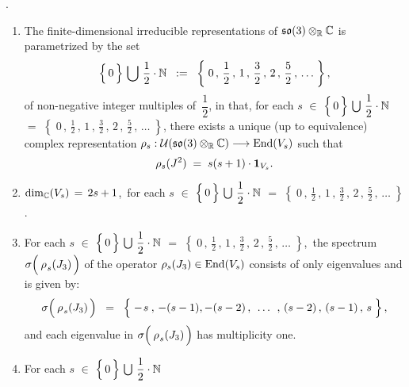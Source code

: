\vskip 0.5cm
\begin{theorem}
{\color{white}.}\vskip -0.1cm
\noindent
\begin{enumerate}
\item
	The finite-dimensional irreducible representations of $\mathfrak{so}(3) \otimes_{\mathbb{R}} \mathbb{C}$ is parametrized by the set
	\begin{equation*}
	\left\{\,\overset{{\color{white}.}}{0}\,\right\} \,\bigcup\, \dfrac{1}{2} \cdot \N
	\;\; := \;\;
		\left\{\;0 \,,\, \dfrac{1}{2} \,,\, 1 \,,\, \frac{3}{2} \,,\, 2 \,,\, \frac{5}{2} \,,\, \ldots \;\right\},
	\end{equation*}
	of non-negative integer multiples of \,$\dfrac{1}{2}$, in that, for each
	$s$
	$\in$ $\left\{\,\overset{{\color{white}.}}{0}\,\right\} \,\bigcup\, \dfrac{1}{2} \cdot \N$
	$=$ $\left\{\; 0 \,,\, \frac{1}{2}\,,\, 1\,,\, \frac{3}{2}\,,\, 2\,,\, \frac{5}{2}\,,\, \ldots \;\right\}$,
	there exists a unique (up to equivalence) complex representation
	$\rho_{s} : \mathcal{U}(\mathfrak{so}(3)\otimes_{\mathbb{R}}\mathbb{C}) \longrightarrow \textnormal{End}(V_{s})$
	such that
	\begin{equation*}
	\rho_{s}(J^{2}) \; = \; s(s+1)\cdot\textnormal{\textbf{1}}_{V_{s}}.
	\end{equation*}
\item
	$\dim_{\mathbb{C}}(V_{s}) \, = \, 2s + 1$,\, for each
	$s$
	$\in$ $\left\{\,\overset{{\color{white}.}}{0}\,\right\} \,\bigcup\, \dfrac{1}{2} \cdot \N$
	$=$ $\left\{\; 0 \,,\, \frac{1}{2}\,,\, 1\,,\, \frac{3}{2}\,,\, 2\,,\, \frac{5}{2}\,,\, \ldots \;\right\}$.
\item
	For each
	$s$
	$\in$ $\left\{\,\overset{{\color{white}.}}{0}\,\right\} \,\bigcup\, \dfrac{1}{2} \cdot \N$
	$=$ $\left\{\; 0 \,,\, \frac{1}{2}\,,\, 1\,,\, \frac{3}{2}\,,\, 2\,,\, \frac{5}{2}\,,\, \ldots \;\right\}$,\,
	the spectrum
	$\sigma\!\left(\,\overset{{\color{white}-}}{\rho}_{s}(J_{3})\,\right)$
	of the operator $\rho_{s}(J_{3}) \in \textnormal{End}(V_{s})$
	consists of only eigenvalues and is given by:
	\begin{equation*}
	\sigma\!\left(\,\overset{{\color{white}-}}{\rho}_{s}(J_{3})\,\right)
	\;\; = \;\;
		\left\{\;
			-\overset{{\color{white}-}}{s} \,,\, -(s-1), -(s-2)
			\,,\;\, \ldots \,\;,\,
			(s-2) \,,\, (s-1) \,,\, s
			\;\right\},
	\end{equation*}
	and each eigenvalue in 
	$\sigma\!\left(\,\overset{{\color{white}-}}{\rho}_{s}(J_{3})\,\right)$
	has multiplicity one.
\item
	For each
	$s$
	$\in$ $\left\{\,\overset{{\color{white}.}}{0}\,\right\} \,\bigcup\, \dfrac{1}{2} \cdot \N$

\end{enumerate}
\end{theorem}
